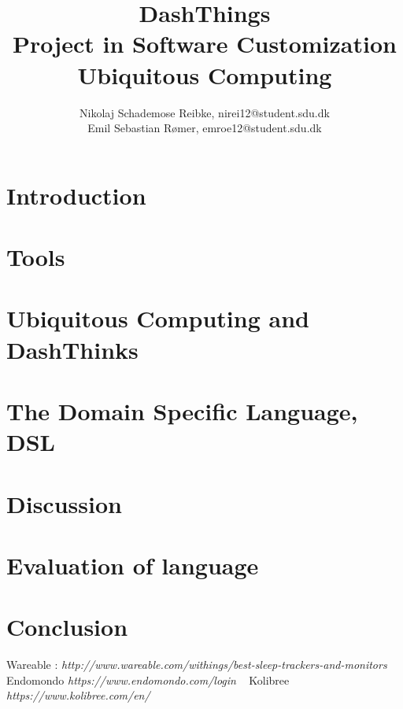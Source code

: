 \documentclass[10pt,a4paper,twocolumn]{article}
\begin{document}
\title{\textbf{DashThings \\ Project in Software Customization Ubiquitous Computing}}

\author{Nikolaj Schademose Reibke, nirei12@student.sdu.dk\\Emil Sebastian R{\o}mer, emroe12@student.sdu.dk}

\maketitle

\section{Introduction}


\section{Tools}


\section{Ubiquitous Computing and DashThinks}


\section{The Domain Specific Language, DSL}


\section{Discussion}


\section{Evaluation of language}


\section{Conclusion}


\begin{thebibliography}{1}
 Wareable : \textit{http://www.wareable.com/withings/best-sleep-trackers-and-monitors} 
 Endomondo \textit{https://www.endomondo.com/login}
\
 Kolibree \textit{https://www.kolibree.com/en/}
\end{thebibliography}
\end{document}
